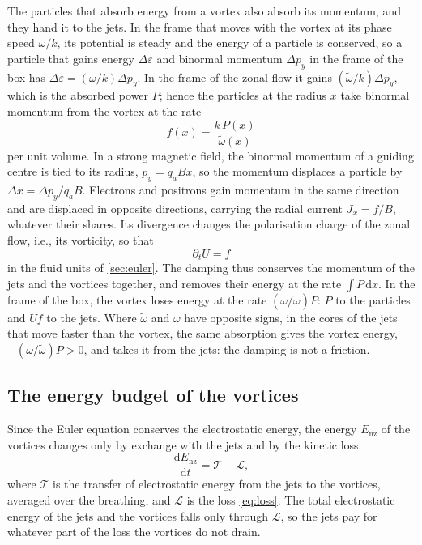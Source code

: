 \documentclass{jpp}
\newcommand{\rmd}{\text{d}}
\newcommand{\pt}{\partial_t}
\newcommand{\Enz}{E_\text{nz}}
\newcommand{\wt}{\tilde\omega}
\begin{document}
The particles that absorb energy from a vortex also absorb its momentum, and they hand it to the jets. In the frame that moves with the vortex at its phase speed \(\omega/k\), its potential is steady and the energy of a particle is conserved, so a particle that gains energy \(\Delta\varepsilon\) and binormal momentum \(\Delta p_y\) in the frame of the box has \(\Delta\varepsilon = (\omega/k)\Delta p_y\). In the frame of the zonal flow it gains \((\wt/k)\Delta p_y\), which is the absorbed power \(P\); hence the particles at the radius \(x\) take binormal momentum from the vortex at the rate
\begin{equation}
f(x) = \frac{k\,P(x)}{\wt(x)}
\label{eq:Iforce}
\end{equation}
per unit volume. In a strong magnetic field, the binormal momentum of a guiding centre is tied to its radius, \(p_y = q_aBx\), so the momentum displaces a particle by \(\Delta x = \Delta p_y/q_aB\). Electrons and positrons gain momentum in the same direction and are displaced in opposite directions, carrying the radial current \(J_x = f/B\), whatever their shares. Its divergence changes the polarisation charge of the zonal flow, i.e., its vorticity, so that
\begin{equation}
\pt U = f
\label{eq:Ijets}
\end{equation}
in the fluid units of \cref{sec:euler}. The damping thus conserves the momentum of the jets and the vortices together, and removes their energy at the rate \(\int P\,\rmd x\). In the frame of the box, the vortex loses energy at the rate \((\omega/\wt)P\): \(P\) to the particles and \(Uf\) to the jets. Where \(\wt\) and \(\omega\) have opposite signs, in the cores of the jets that move faster than the vortex, the same absorption gives the vortex energy, \(-(\omega/\wt)P > 0\), and takes it from the jets: the damping is not a friction.

\subsection{The energy budget of the vortices}\label{sec:decay}

Since the Euler equation conserves the electrostatic energy, the energy \(\Enz\) of the vortices changes only by exchange with the jets and by the kinetic loss:
\begin{equation}
\frac{\rmd\Enz}{\rmd t} = \mathcal{T} - \mathcal{L},
\label{eq:budget}
\end{equation}
where \(\mathcal{T}\) is the transfer of electrostatic energy from the jets to the vortices, averaged over the breathing, and \(\mathcal{L}\) is the loss \cref{eq:loss}. The total electrostatic energy of the jets and the vortices falls only through \(\mathcal{L}\), so the jets pay for whatever part of the loss the vortices do not drain.
\end{document}
